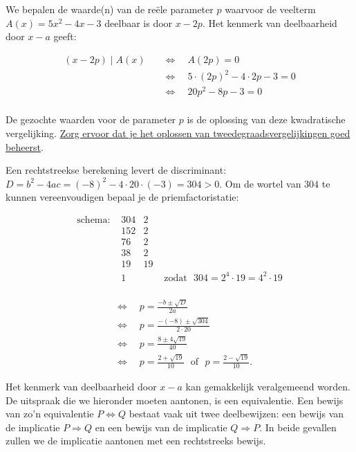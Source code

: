 \documentclass{ximera}
\begin{document}
\begin{example} 
We bepalen de waarde(n) van de reële parameter \(p\) waarvoor de veelterm \(A(x) = 5x^2-4x-3\) deelbaar is door \(x-2p\). Het kenmerk van deelbaarheid door \(x-a\) geeft:

\begin{align*}
(x-2p) \mid A(x) \quad 
& \Leftrightarrow \quad A(2p) = 0 \\
& \Leftrightarrow \quad 5 \cdot (2p)^2 - 4 \cdot 2p - 3 = 0 \\
& \Leftrightarrow \quad 20p^2 - 8p - 3 = 0 \\
\end{align*}

De gezochte waarden voor de parameter \(p \) is de oplossing van deze kwadratische vergelijking. \href{https://wiskunde.opmaat.org/rekenoffensief/vaardigheden/tweede_graad/kwadratische_vergelijkingen}{Zorg ervoor dat je het oplossen van tweedegraadsvergelijkingen goed beheerst}. 


Een rechtstreekse berekening levert de discriminant: \(D = b^2-4ac = (-8)^2-4 \cdot 20 \cdot (-3) = 304 > 0 \). Om de wortel van \(304\) te kunnen vereenvoudigen bepaal je de priemfactoristatie: 

\[
\begin{array}{lc|cr}
\text{schema: } & 304 & 2 \\
& 152 & 2 \\
& 76 & 2 \\
& 38 & 2 \\
& 19 & 19 \\
& 1 & & \text{ zodat } \,\, 304 = 2^4 \cdot 19 = 4^2 \cdot 19
\end{array}
\]

\begin{align*} \\
& \Leftrightarrow \quad p = \frac{-b \pm \sqrt{D}}{2a} \\ 
& \Leftrightarrow \quad p = \frac{-(-8) \pm \sqrt{304}}{2 \cdot 20} \\ 
& \Leftrightarrow \quad p = \frac{8 \pm 4\sqrt{19}}{40} \\
& \Leftrightarrow \quad p = \frac{2 + \sqrt{19}}{10} \,\, \text{ of } \,\, p = \frac{2 - \sqrt{19}}{10}.
\end{align*}

\end{example} 


Het kenmerk van deelbaarheid door \(x-a\) kan gemakkelijk veralgemeend worden. De uitspraak die we hieronder moeten aantonen, is een equivalentie. Een bewijs van zo'n equivalentie \(P \Leftrightarrow Q\) bestaat vaak uit twee deelbewijzen: een bewijs van de implicatie \(P \Rightarrow Q\) en een bewijs van de implicatie \(Q \Rightarrow P\). In beide gevallen zullen we de implicatie aantonen met een rechtstreeks bewijs.
\end{document}
